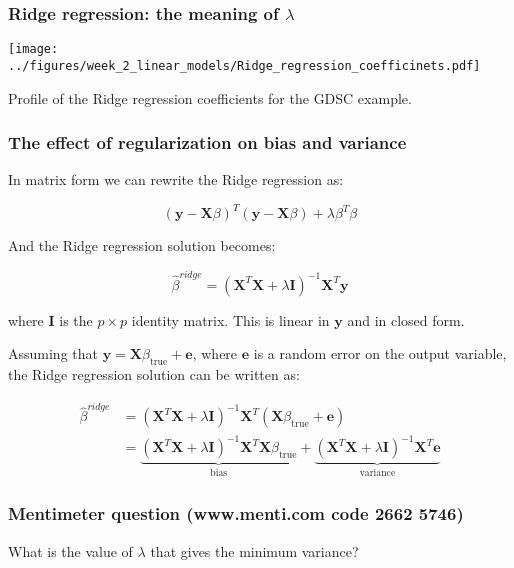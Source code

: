 \documentclass[notes]{beamer}          %
\begin{document}
\begin{frame}
\frametitle{Ridge regression: the meaning of $\lambda$}


\begin{center}

\texttt{[image: ../figures/week\_2\_linear\_models/Ridge\_regression\_coefficinets.pdf]}
\end{center}

Profile of the Ridge regression coefficients for the GDSC example.

\end{frame}

\begin{frame}
\frametitle{The effect of regularization on bias and variance}
In matrix form we can rewrite the Ridge regression as:

\begin{equation*}
    (\mathbf{y} - \mathbf{X}\beta)^T (\mathbf{y} - \mathbf{X}\beta) + \lambda\beta^T\beta
\end{equation*}

And the Ridge regression solution becomes:

\begin{equation*}
    \hat{\beta}^{ridge} = (\mathbf{X}^T \mathbf{X} + \lambda \mathbf{I})^{-1}\mathbf{X}^T\mathbf{y} 
\end{equation*}

where $\mathbf{I}$ is the $p \times p$ identity matrix. This is linear in $\mathbf{y}$ and in closed form.

Assuming that $\mathbf{y} = \mathbf{X}\beta_{\mathrm{true}} + \mathbf{e}$, where $\mathbf{e}$ is a random error on the output variable, the Ridge regression solution can be written as:

\begin{align*}
    \hat{\beta}^{ridge} &= (\mathbf{X}^T \mathbf{X} + \lambda \mathbf{I})^{-1}\mathbf{X}^T(\mathbf{X}\beta_{\mathrm{true}} + \mathbf{e}) \\
    &= \underbrace{(\mathbf{X}^T \mathbf{X} + \lambda \mathbf{I})^{-1}\mathbf{X}^T\mathbf{X}\beta_{\mathrm{true}}}_{\textrm{bias}} + \underbrace{(\mathbf{X}^T \mathbf{X} + \lambda \mathbf{I})^{-1}\mathbf{X}^T\mathbf{e}}_{\textrm{variance}}
\end{align*}

\end{frame}

\begin{frame}
\frametitle{Mentimeter question (www.menti.com code 2662 5746)}

What is the value of $\lambda$ that gives the minimum variance?

\end{frame}
\end{document}
